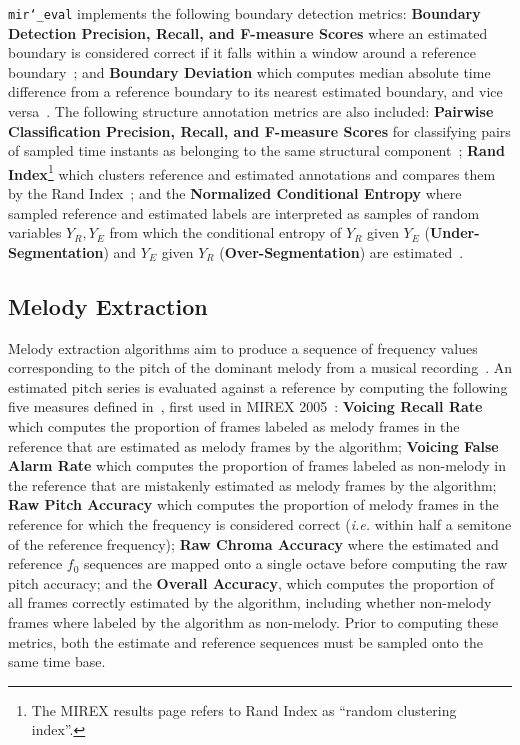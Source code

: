 \documentclass{article}
\def\ie{\emph{i.e.}}
\def\mireval{\texttt{mir\char`_eval}}
\begin{document}
\mireval{} implements the following boundary detection metrics:
\textbf{Boundary Detection Precision, Recall, and F-measure Scores} where an estimated
boundary is considered correct if it falls within a window around a reference boundary~\cite{turnbull2007supervised};
and \textbf{Boundary Deviation} which computes median absolute time difference from a
reference boundary to its nearest estimated boundary, and vice versa~\cite{turnbull2007supervised}.
The following structure annotation metrics are also included:
\textbf{Pairwise Classification Precision, Recall, and F-measure Scores} for classifying pairs of sampled time instants as belonging to the same structural component~\cite{levy2008structural};
\textbf{Rand Index}\footnote{The MIREX results page refers to Rand Index as ``random
clustering index''.} which clusters reference and estimated annotations and compares
them by the Rand Index~\cite{rand1971objective};
and the \textbf{Normalized Conditional Entropy} where sampled reference and estimated
labels are interpreted as samples of random variables $Y_R, Y_E$ from which the
conditional entropy of $Y_R$ given $Y_E$ (\textbf{Under-Segmentation}) and $Y_E$ given
$Y_R$  (\textbf{Over-Segmentation}) are estimated~\cite{lukashevich2008towards}.

\subsection{Melody Extraction}

Melody extraction algorithms aim to produce a sequence of frequency values
corresponding to the pitch of the dominant melody from a musical recording~\cite{salamon:MelodyReview:IEEESPM13}.
An estimated pitch series is evaluated against a reference by computing the following
five measures defined in~\cite{salamon:MelodyReview:IEEESPM13}, first used in MIREX
2005~\cite{polinerMelodyEval}:
\textbf{Voicing Recall Rate} which computes the proportion of frames labeled as melody frames in the reference that are estimated as melody frames by the algorithm;
\textbf{Voicing False Alarm Rate} which computes the proportion of frames labeled as non-melody in the reference that are mistakenly estimated as melody frames by the algorithm;
\textbf{Raw Pitch Accuracy} which computes the proportion of melody frames in the reference for which the frequency is considered correct (\ie{} within half a semitone of the reference frequency);
\textbf{Raw Chroma Accuracy} where the estimated and reference $f_0$ sequences are mapped onto a single octave before computing the raw pitch accuracy;
and the \textbf{Overall Accuracy}, which computes the proportion of all frames correctly estimated by the algorithm, including whether non-melody frames where labeled by the algorithm as non-melody.
Prior to computing these metrics, both the estimate and reference sequences must be sampled onto the same time base.
\end{document}
